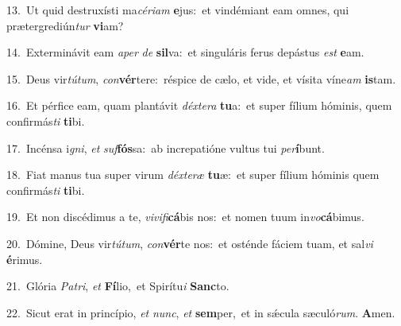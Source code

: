 {\numbfont\textcolor{\numbcolor}{13.}}~Ut quid destruxísti ma\-\textit{cé}\-\textit{ri}\textit{am} \textbf{e}\-jus:~\star et vindémiant eam omnes, qui prætergrediún\textit{tur} \textbf{vi}\-am?\par
{\numbfont\textcolor{\numbcolor}{14.}}~Exterminávit eam \textit{a}\-\textit{per} \textit{de} \textbf{sil}\-va:~\star et singuláris ferus depástus \textit{est} \textbf{e}\-am.\par
{\numbfont\textcolor{\numbcolor}{15.}}~Deus vir\-\textit{tú}\-\textit{tum}, \textit{con}\-\textbf{vér}tere:~\star réspice de cælo, et vide, et vísita víne\textit{am} \textbf{is}\-tam.\par
{\numbfont\textcolor{\numbcolor}{16.}}~Et pérfice eam, quam plantávit \textit{déx}\-\textit{te}\textit{ra} \textbf{tu}\-a:~\star et super fílium hóminis, quem confirmás\textit{ti} \textbf{ti}\-bi.\par
{\numbfont\textcolor{\numbcolor}{17.}}~Incénsa i\-\textit{gni}\-, \textit{et} \textit{suf}\-\textbf{fós}sa:~\star ab increpatióne vultus tui \textit{per}\-\textbf{í}bunt.\par
{\numbfont\textcolor{\numbcolor}{18.}}~Fiat manus tua super virum \textit{déx}\-\textit{te}\textit{ræ} \textbf{tu}\-æ:~\star et super fílium hóminis quem confirmás\textit{ti} \textbf{ti}\-bi.\par
{\numbfont\textcolor{\numbcolor}{19.}}~Et non discédimus a te, \textit{vi}\-\textit{vi}\textit{fi}\textbf{cá}bis nos:~\star et nomen tuum in\-\textit{vo}\-\textbf{cá}bimus.\par
{\numbfont\textcolor{\numbcolor}{20.}}~Dómine, Deus vir\-\textit{tú}\-\textit{tum}, \textit{con}\-\textbf{vér}te nos:~\star et osténde fáciem tuam, et sal\textit{vi} \textbf{é}\-rimus.\par
{\numbfont\textcolor{\numbcolor}{21.}}~Glória \textit{Pa}\-\textit{tri}, \textit{et} \textbf{Fí}\-lio,~\star et Spirítu\textit{i} \textbf{Sanc}\-to.\par
{\numbfont\textcolor{\numbcolor}{22.}}~Sicut erat in princípio, \textit{et} \textit{nunc}\-, \textit{et} \textbf{sem}\-per,~\star et in sǽcula sæculó\-\textit{rum}\-. \textbf{A}\-men.\par
